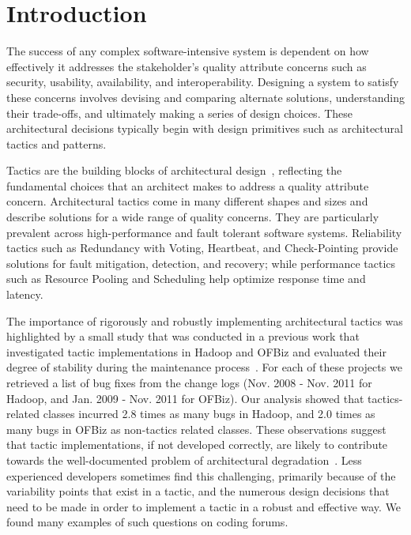 \section{Introduction}
The success of any complex software-intensive system is dependent on how effectively it addresses the stakeholder's quality attribute concerns such as security, usability, availability, and interoperability. Designing a system to satisfy these concerns involves devising and comparing alternate solutions, understanding their trade-offs, and ultimately making a series of design choices. These architectural decisions typically begin with design primitives such as architectural tactics and patterns.

Tactics are the building blocks of architectural design~\cite{bass:arch12}, reflecting the fundamental choices that an architect makes to address a quality attribute concern. Architectural tactics come in many different shapes and sizes and describe solutions for a wide range of quality concerns. They are particularly prevalent across high-performance and fault tolerant software systems. Reliability tactics such as Redundancy with Voting, Heartbeat, and Check-Pointing provide solutions for fault mitigation, detection, and recovery; while performance tactics such as Resource Pooling and Scheduling help optimize response time and latency.




The importance of rigorously and robustly implementing architectural tactics was highlighted by a small study that was conducted in a previous work that investigated tactic implementations in Hadoop and OFBiz and evaluated their degree of stability during the maintenance process~\cite{MSRBuble}. For each of these projects we retrieved a list of bug fixes from the change logs (Nov. 2008 - Nov. 2011 for Hadoop, and Jan. 2009 - Nov. 2011 for OFBiz). Our analysis showed that tactics-related classes incurred 2.8 times as many bugs in Hadoop, and 2.0 times as many bugs in OFBiz as non-tactics related classes. These observations suggest that tactic implementations, if not developed correctly, are likely to contribute towards the well-documented problem of architectural degradation~\cite{Erosion}. Less experienced developers sometimes find this challenging, primarily because of the variability points that exist in a tactic, and the numerous design decisions that need to be made in order to implement a tactic in a robust and effective way. We found many examples of such questions on coding forums.

